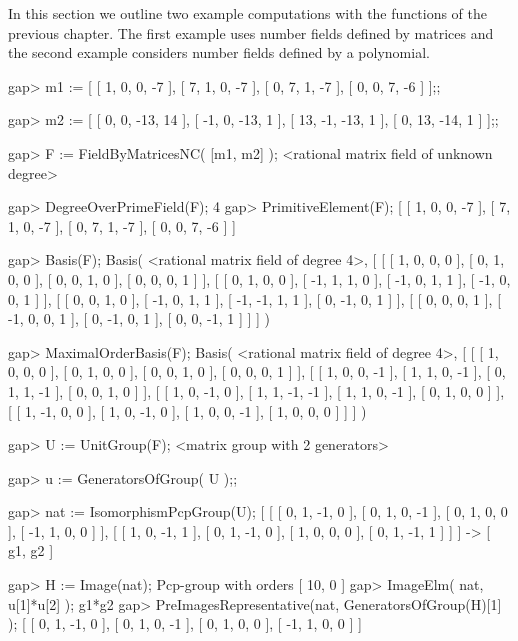 

In this section we outline two example computations with the functions
of the previous chapter. The first example uses number fields defined 
by matrices and the second example considers number fields defined by
a polynomial.


\beginexample
gap> m1 := [ [ 1, 0, 0, -7 ], 
             [ 7, 1, 0, -7 ], 
             [ 0, 7, 1, -7 ],
             [ 0, 0, 7, -6 ] ];;

gap> m2 := [ [ 0, 0, -13, 14 ], 
             [ -1, 0, -13, 1 ], 
             [ 13, -1, -13, 1 ], 
             [ 0, 13, -14, 1 ] ];;

gap> F := FieldByMatricesNC( [m1, m2] );
<rational matrix field of unknown degree>

gap> DegreeOverPrimeField(F);
4
gap> PrimitiveElement(F);
[ [ 1, 0, 0, -7 ], [ 7, 1, 0, -7 ], [ 0, 7, 1, -7 ], [ 0, 0, 7, -6 ] ]

gap> Basis(F);
Basis( <rational matrix field of degree 4>,
[ [ [ 1, 0, 0, 0 ], [ 0, 1, 0, 0 ], [ 0, 0, 1, 0 ], [ 0, 0, 0, 1 ] ], 
  [ [ 0, 1, 0, 0 ], [ -1, 1, 1, 0 ], [ -1, 0, 1, 1 ], [ -1, 0, 0, 1 ] ], 
  [ [ 0, 0, 1, 0 ], [ -1, 0, 1, 1 ], [ -1, -1, 1, 1 ], [ 0, -1, 0, 1 ] ], 
  [ [ 0, 0, 0, 1 ], [ -1, 0, 0, 1 ], [ 0, -1, 0, 1 ], [ 0, 0, -1, 1 ] ] ] )

gap> MaximalOrderBasis(F);
Basis( <rational matrix field of degree 4>,
[ [ [ 1, 0, 0, 0 ], [ 0, 1, 0, 0 ], [ 0, 0, 1, 0 ], [ 0, 0, 0, 1 ] ], 
  [ [ 1, 0, 0, -1 ], [ 1, 1, 0, -1 ], [ 0, 1, 1, -1 ], [ 0, 0, 1, 0 ] ], 
  [ [ 1, 0, -1, 0 ], [ 1, 1, -1, -1 ], [ 1, 1, 0, -1 ], [ 0, 1, 0, 0 ] ], 
  [ [ 1, -1, 0, 0 ], [ 1, 0, -1, 0 ], [ 1, 0, 0, -1 ], [ 1, 0, 0, 0 ] ] ] )

gap> U := UnitGroup(F);
<matrix group with 2 generators>

gap> u := GeneratorsOfGroup( U );;

gap> nat := IsomorphismPcpGroup(U);
[ [ [ 0, 1, -1, 0 ], [ 0, 1, 0, -1 ], [ 0, 1, 0, 0 ], [ -1, 1, 0, 0 ] ], 
  [ [ 1, 0, -1, 1 ], [ 0, 1, -1, 0 ], [ 1, 0, 0, 0 ], [ 0, 1, -1, 1 ] ] ] -> 
[ g1, g2 ]

gap> H := Image(nat);
Pcp-group with orders [ 10, 0 ]
gap> ImageElm( nat, u[1]*u[2] );
g1*g2
gap> PreImagesRepresentative(nat, GeneratorsOfGroup(H)[1] );
[ [ 0, 1, -1, 0 ], [ 0, 1, 0, -1 ], [ 0, 1, 0, 0 ], [ -1, 1, 0, 0 ] ]
\endexample

